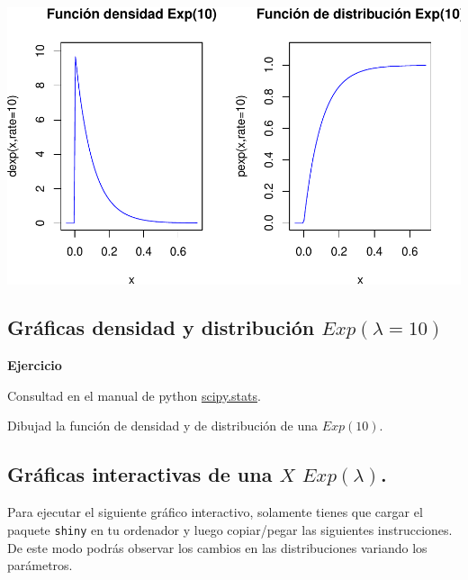 \documentclass[]{book}
\begin{document}
\begin{center}\includegraphics{curso-probabilidad-udemy_files/figure-latex/unnamed-chunk-89-1} \end{center}

\hypertarget{gruxe1ficas-densidad-y-distribuciuxf3n-explambda10-2}{%
\subsection{\texorpdfstring{Gráficas densidad y distribución \(Exp(\lambda=10)\)}{Gráficas densidad y distribución Exp(\textbackslash{}lambda=10)}}\label{gruxe1ficas-densidad-y-distribuciuxf3n-explambda10-2}}

\textbf{Ejercicio}

Consultad en el manual de python \href{https://docs.scipy.org/doc/scipy/reference/generated/scipy.stats.expon.html}{scipy.stats}.

Dibujad la función de densidad y de distribución de una \(Exp(10).\)

\hypertarget{gruxe1ficas-interactivas-de-una-x-explambda.}{%
\subsection{\texorpdfstring{Gráficas interactivas de una \(X\) \(Exp(\lambda)\).}{Gráficas interactivas de una X Exp(\textbackslash{}lambda).}}\label{gruxe1ficas-interactivas-de-una-x-explambda.}}

Para ejecutar el siguiente gráfico interactivo, solamente tienes que cargar el paquete \texttt{shiny} en tu ordenador y luego copiar/pegar las siguientes instrucciones. De este modo podrás observar los cambios en las distribuciones variando los parámetros.
\end{document}
